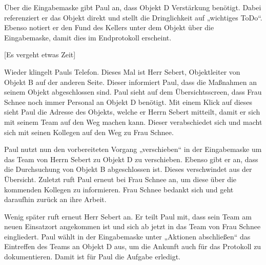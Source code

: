 Über die Eingabemaske gibt Paul an, dass Objekt D Verstärkung benötigt. 
Dabei referenziert er das Objekt direkt und stellt die Dringlichkeit auf „wichtiges ToDo“. 
Ebenso notiert er den Fund des Kellers unter dem Objekt über die Eingabemaske, damit dies im Endprotokoll erscheint.

[Es vergeht etwas Zeit]

Wieder klingelt Pauls Telefon. 
Dieses Mal ist Herr Sebert, Objektleiter von Objekt B auf der anderen Seite. 
Dieser informiert Paul, dass die Maßnahmen an seinem Objekt abgeschlossen sind. 
Paul sieht auf dem Übersichtsscreen, dass Frau Schnee noch immer Personal an Objekt D benötigt. 
Mit einem Klick auf dieses sieht Paul die Adresse des Objekts, welche er Herrn Sebert mitteilt, damit er sich mit seinem Team auf den Weg machen kann. 
Dieser verabschiedet sich und macht sich mit seinen Kollegen auf den Weg zu Frau Schnee.

Paul nutzt nun den vorbereiteten Vorgang „verschieben“ in der Eingabemaske um das Team von Herrn Sebert zu Objekt D zu verschieben. 
Ebenso gibt er an, dass die Durchsuchung von Objekt B abgeschlossen ist. 
Dieses verschwindet aus der Übersicht. Zuletzt ruft Paul erneut bei Frau Schnee an, um diese über die kommenden Kollegen zu informieren. 
Frau Schnee bedankt sich und geht daraufhin zurück an ihre Arbeit.

Wenig später ruft erneut Herr Sebert an. 
Er teilt Paul mit, dass sein Team am neuen Einsatzort angekommen ist und sich ab jetzt in das Team von Frau Schnee eingliedert. 
Paul wählt in der Eingabemaske unter „Aktionen abschließen“ das Eintreffen des Teams an Objekt D aus, um die Ankunft auch für das Protokoll zu dokumentieren.
Damit ist für Paul die Aufgabe erledigt. 
